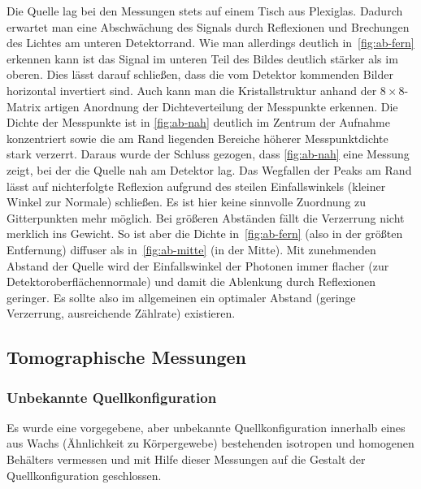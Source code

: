 \documentclass[slug=PET, room=Andreas-Schubert-Bau\,\ 424A, supervisor=Carsten\ Bittrich, coursedate=10.\ 01.\ 2020]{../../Lab_Report_LaTeX/lab_report}
\begin{document}
Die Quelle lag bei den Messungen stets auf einem Tisch aus
Plexiglas. Dadurch erwartet man eine Abschwächung des Signals durch
Reflexionen und Brechungen des Lichtes am unteren Detektorrand.  Wie
man allerdings deutlich in~\ref{fig:ab-fern} erkennen kann ist das
Signal im unteren Teil des Bildes deutlich stärker als im oberen. Dies
lässt darauf schließen, dass die vom Detektor kommenden Bilder
horizontal invertiert sind.  Auch kann man die Kristallstruktur anhand
der \(8\times 8\)-Matrix artigen Anordnung der Dichteverteilung der
Messpunkte erkennen.  Die Dichte der Messpunkte ist in
\ref{fig:ab-nah} deutlich im Zentrum der Aufnahme konzentriert sowie
die am Rand liegenden Bereiche höherer Messpunktdichte stark
verzerrt. Daraus wurde der Schluss gezogen, dass \ref{fig:ab-nah} eine Messung
zeigt, bei der die Quelle nah am Detektor lag. Das Wegfallen der Peaks
am Rand l\"asst auf nichterfolgte Reflexion aufgrund des steilen
Einfallswinkels (kleiner Winkel zur Normale) schließen. Es ist hier
keine sinnvolle Zuordnung zu Gitterpunkten mehr m\"oglich.  Bei
gr\"o\ss{}eren Abst\"anden f\"allt die Verzerrung nicht merklich ins
Gewicht. So ist aber die Dichte in~\ref{fig:ab-fern} (also in der
gr\"o\ss{}ten Entfernung) diffuser als in~\ref{fig:ab-mitte} (in der
Mitte). Mit zunehmenden Abstand der Quelle wird der Einfallswinkel der
Photonen immer flacher (zur Detektoroberfl\"achennormale) und damit
die Ablenkung durch Reflexionen geringer. Es sollte also im
allgemeinen ein optimaler Abstand (geringe Verzerrung, ausreichende
Z\"ahlrate) existieren.


\subsection{Tomographische Messungen}
\label{sec:tom}

\subsubsection{Unbekannte Quellkonfiguration}
\label{sec:tom1}

Es wurde eine vorgegebene, aber unbekannte Quellkonfiguration
innerhalb eines aus Wachs (\"Ahnlichkeit zu K\"orpergewebe)
bestehenden isotropen und homogenen Beh\"alters vermessen und mit Hilfe
dieser Messungen auf die Gestalt der Quellkonfiguration geschlossen.
\end{document}
